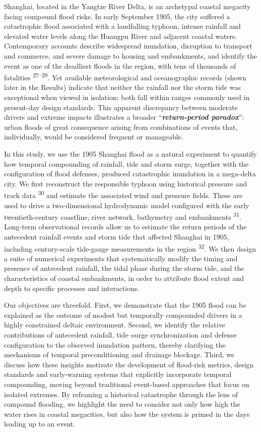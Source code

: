 \documentclass[
]{article}
\begin{document}
Shanghai, located in the Yangtze River Delta, is an archetypal coastal
megacity facing compound flood risks. In early September 1905, the city
suffered a catastrophic flood associated with a landfalling typhoon,
intense rainfall and elevated water levels along the Huangpu River and
adjacent coastal waters. Contemporary accounts describe widespread
inundation, disruption to transport and commerce, and severe damage to
housing and embankments, and identify the event as one of the deadliest
floods in the region, with tens of thousands of fatalities
\textsuperscript{27--29}. Yet available meteorological and oceanographic
records (shown later in the Results) indicate that neither the rainfall
nor the storm tide was exceptional when viewed in isolation; both fall
within ranges commonly used in present-day design standards. This
apparent discrepancy between moderate drivers and extreme impacts
illustrates a broader ``\emph{\textbf{return-period paradox}}'': urban
floods of great consequence arising from combinations of events that,
individually, would be considered frequent or manageable.

In this study, we use the 1905 Shanghai flood as a natural experiment to
quantify how temporal compounding of rainfall, tide and storm surge,
together with the configuration of flood defenses, produced catastrophic
inundation in a mega-delta city. We first reconstruct the responsible
typhoon using historical pressure and track data \textsuperscript{30}
and estimate the associated wind and pressure fields. These are used to
drive a two-dimensional hydrodynamic model configured with the early
twentieth-century coastline, river network, bathymetry and embankments
\textsuperscript{31}. Long-term observational records allow us to
estimate the return periods of the antecedent rainfall events and storm
tide that affected Shanghai in 1905, including century-scale tide-gauge
measurements in the region \textsuperscript{32}. We then design a suite
of numerical experiments that systematically modify the timing and
presence of antecedent rainfall, the tidal phase during the storm tide,
and the characteristics of coastal embankments, in order to attribute
flood extent and depth to specific processes and interactions.

Our objectives are threefold. First, we demonstrate that the 1905 flood
can be explained as the outcome of modest but temporally compounded
drivers in a highly constrained deltaic environment. Second, we identify
the relative contributions of antecedent rainfall, tide--surge
synchronization and defense configuration to the observed inundation
pattern, thereby clarifying the mechanisms of temporal preconditioning
and drainage blockage. Third, we discuss how these insights motivate the
development of flood-risk metrics, design standards and early-warning
systems that explicitly incorporate temporal compounding, moving beyond
traditional event-based approaches that focus on isolated extremes. By
reframing a historical catastrophe through the lens of compound
flooding, we highlight the need to consider not only how high the water
rises in coastal megacities, but also how the system is primed in the
days leading up to an event.
\end{document}
